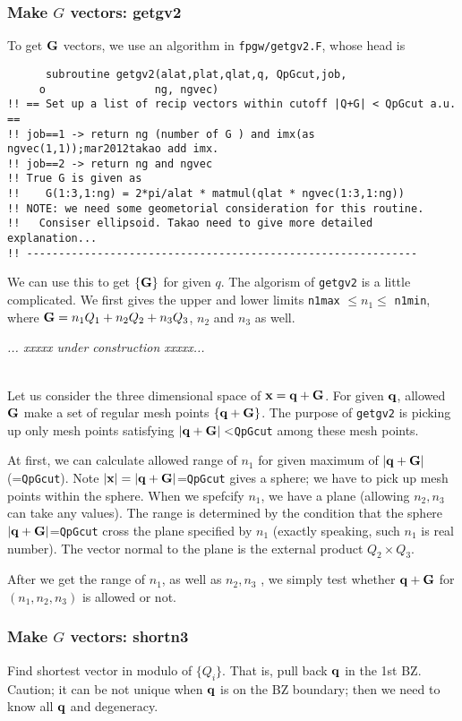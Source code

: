 \documentclass[a4paper,10pt,fleqn]{article}
\def\underconstruction{{\it... xxxxx under construction xxxxx...\\}}
\newcommand{\bfq}{{\bf q}}
\newcommand{\bfG}{{\bf G}}
\begin{document}
\subsubsection{Make $G$ vectors: getgv2}
To get $\bfG$ vectors, we use an algorithm in \verb!fpgw/getgv2.F!, whose head
is
\begin{verbatim}
      subroutine getgv2(alat,plat,qlat,q, QpGcut,job,
     o                 ng, ngvec)
!! == Set up a list of recip vectors within cutoff |Q+G| < QpGcut a.u. ==
!! job==1 -> return ng (number of G ) and imx(as ngvec(1,1));mar2012takao add imx.
!! job==2 -> return ng and ngvec
!! True G is given as
!!    G(1:3,1:ng) = 2*pi/alat * matmul(qlat * ngvec(1:3,1:ng))
!! NOTE: we need some geometorial consideration for this routine.
!!   Consiser ellipsoid. Takao need to give more detailed explanation...
!! -------------------------------------------------------------
\end{verbatim}
We can use this to get $\{\bfG\}$ for given $q$.
The algorism of \verb!getgv2! is a little complicated.
We first gives the upper and lower limits {\tt n1max} $\le n_1 \le $ {\tt n1min}, 
where $\bfG= n_1 Q_1 + n_2 Q_2 + n_3 Q_3$, $n_2$ and $n_3$ as well.

\underconstruction

\\
Let us consider the three dimensional space of ${\bf x}= \bfq+\bfG$.
For given $\bfq$, allowed $\bfG$ make a set of regular mesh points $\{\bfq+\bfG\}$.
The purpose of {\tt getgv2} is picking up only mesh points satisfying
$|\bfq+\bfG|<${\tt QpGcut} among these mesh points.

At first, we can calculate allowed range of $n_1$ for given maximum of 
$|\bfq+\bfG|$ (={\tt QpGcut}). Note $|{\bf x}|=|\bfq+\bfG|$={\tt QpGcut}
gives a sphere; we have to pick up mesh points within the sphere.
When we spefcify $n_1$, we have a plane 
(allowing $n_2,n_3$ can take any values).
The range is determined by the condition that the sphere 
$|\bfq+\bfG|$={\tt QpGcut} cross the plane specified by $n_1$ 
(exactly speaking, such $n_1$ is real number).
The vector normal to the plane is the external product $Q_2 \times Q_3$.

After we get the range of $n_1$, as well as $n_2,n_3$ ,
we simply test whether $\bfq+\bfG$ for $(n_1,n_2,n_3)$ is allowed or not.


\subsubsection{Make $G$ vectors: shortn3}
Find shortest vector in modulo of $\{Q_i\}$. That is, pull back $\bfq$ in the 1st BZ.
Caution; it can be not unique when $\bfq$ is on the BZ boundary;
then we need to know all $\bfq$ and degeneracy.
\end{document}
